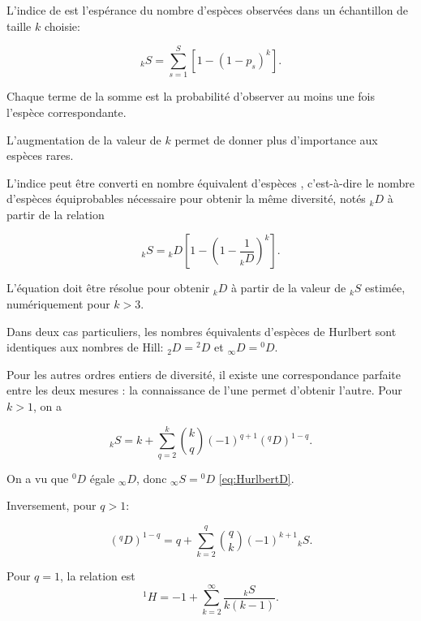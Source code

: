 \documentclass[
  11pt,
  french,
  a4paper,
  extrafontsizes,onecolumn,openright
  ]{memoir}
\newlength{\rf}
\begin{document}
L'indice de \textcite{Hurlbert1971} est l'espérance du nombre d'espèces observées dans un échantillon de taille \(k\) choisie:

\begin{equation}
  \label{eq:HurlbertSk}
  _{k}S = \sum^S_{s=1}{\left[1-{\left(1-p_s\right)}^k\right]}.
\end{equation}

Chaque terme de la somme est la probabilité d'observer au moins une fois l'espèce correspondante.

L'augmentation de la valeur de \(k\) permet de donner plus d'importance aux espèces rares.

L'indice peut être converti en nombre équivalent d'espèces \autocite{Dauby2012}, c'est-à-dire le nombre d'espèces équiprobables nécessaire pour obtenir la même diversité, notés \(_{k}D\) à partir de la relation

\begin{equation}
  \label{eq:HurlbertD}
  _{k}S = {_{k}D} \left[1-{\left(1-\frac{1}{_{k}D}\right)}^k\right].
\end{equation}

L'équation doit être résolue pour obtenir \(_{k}D\) à partir de la valeur de \(_{k}S\) estimée, numériquement pour \(k>3\).

Dans deux cas particuliers, les nombres équivalents d'espèces de Hurlbert sont identiques aux nombres de Hill: \(_{2}D ={^{2}\!D}\) et \(_{\infty}D={^{0}\!D}\).

Pour les autres ordres entiers de diversité, il existe une correspondance parfaite entre les deux mesures \autocite[Annexe S2]{Chao2014}: la connaissance de l'une permet d'obtenir l'autre. Pour \(k>1\), on a \autocite{Leinster2012}

\begin{equation}
  \label{eq:HurlbertDq}
  _{k}S = k + \sum_{q=2}^{k}{\binom{k}{q} (-1)^{q+1} (^{q}\!D)^{1-q}}.
\end{equation}

On a vu que \(^{0}\!D\) égale \(_{\infty}D\), donc \(_{\infty}S={^{0}\!D}\) \eqref{eq:HurlbertD}.

Inversement, pour \(q>1\):

\begin{equation}
  \label{eq:DqHurlbert}
  (^{q}\!D)^{1-q} = q + \sum_{k=2}^{q}{\binom{q}{k} (-1)^{k+1} {_{k}S}}.
\end{equation}

Pour \(q=1\), la relation est \autocite{Mao2007}
\begin{equation}
  \label{eq:Mao2007}
  ^{1}\!H = -1 + \sum_{k=2}^{\infty}{\frac{_{k}S}{k(k-1)}}.
\end{equation}
\end{document}
